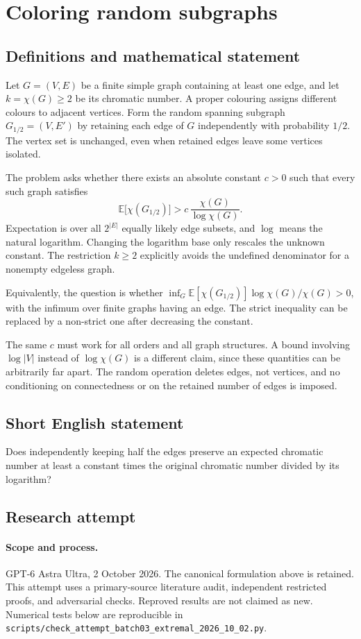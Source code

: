 \documentclass[11pt,a4paper]{article}
\begin{document}
\section*{Coloring random subgraphs}\label{statement}

\subsection{Definitions and mathematical statement}
Let $G=(V,E)$ be a finite simple graph containing at least one edge,
and let $k=\chi(G)\ge2$ be its chromatic number. A proper colouring
assigns different colours to adjacent vertices. Form the random
spanning subgraph $G_{1/2}=(V,E')$ by retaining each edge of $G$
independently with probability $1/2$. The vertex set is unchanged,
even when retained edges leave some vertices isolated.

The problem asks whether there exists an absolute constant $c>0$
such that every such graph satisfies
\[
                   \mathbb E\bigl[\chi(G_{1/2})\bigr]
                      >c\,\frac{\chi(G)}{\log\chi(G)}.
\]
Expectation is over all $2^{|E|}$ equally likely edge subsets, and
$\log$ means the natural logarithm. Changing the logarithm base only
rescales the unknown constant. The restriction $k\ge2$ explicitly
avoids the undefined denominator for a nonempty edgeless graph.

Equivalently, the question is whether
$\inf_G\mathbb E[\chi(G_{1/2})]\log\chi(G)/\chi(G)>0$, with the
infimum over finite graphs having an edge. The strict inequality can
be replaced by a non-strict one after decreasing the constant.

The same $c$ must work for all orders and all graph structures. A
bound involving $\log|V|$ instead of $\log\chi(G)$ is a different
claim, since these quantities can be arbitrarily far apart. The
random operation deletes edges, not vertices, and no conditioning
on connectedness or on the retained number of edges is imposed.
\subsection{Short English statement}
Does independently keeping half the edges preserve an expected chromatic number at least a constant times the original chromatic number divided by its logarithm?
\subsection{Research attempt}
\paragraph{Scope and process.}
GPT-6 Astra Ultra, 2 October 2026. The canonical formulation above is retained. This attempt uses a primary-source literature audit, independent restricted proofs, and adversarial checks. Reproved results are not claimed as new. Numerical tests below are reproducible in \texttt{scripts/check\_attempt\_batch03\_extremal\_2026\_10\_02.py}.
\end{document}
